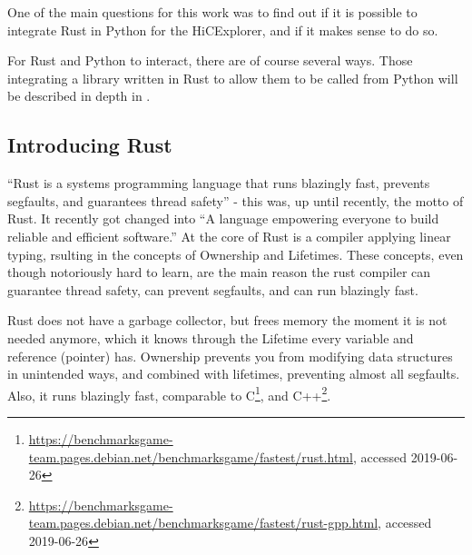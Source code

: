 
One of the main questions for this work was to find out if it is possible to
integrate Rust in Python for the HiCExplorer, and if it makes sense to do so.


For Rust and Python to interact, there are of course several ways. Those
integrating a library written in Rust to allow them to be called from Python
will be described in depth in .





\subsection{Introducing Rust}

``Rust is a systems programming language that runs blazingly fast, prevents
segfaults, and guarantees thread safety'' - this was, up until recently, the
motto of Rust. It recently got changed into ``A language empowering everyone
to build reliable and efficient software.'' At the core of Rust is a compiler
applying linear typing, rsulting in the concepts of Ownership and Lifetimes.
These concepts, even though notoriously hard to learn, are the main reason the
rust compiler can guarantee thread safety, can prevent segfaults, and can run
blazingly fast.




Rust does not have a garbage collector, but frees memory the moment it is not
needed anymore, which it knows through the Lifetime every variable and
reference (pointer) has. Ownership prevents you from modifying data structures
in unintended ways, and combined with lifetimes, preventing almost all
segfaults. Also, it runs blazingly fast, comparable to
C\footnote{\url{https://benchmarksgame-team.pages.debian.net/benchmarksgame/fastest/rust.html},
accessed 2019-06-26}, and
C++\footnote{\url{https://benchmarksgame-team.pages.debian.net/benchmarksgame/fastest/rust-gpp.html},
accessed 2019-06-26}.

